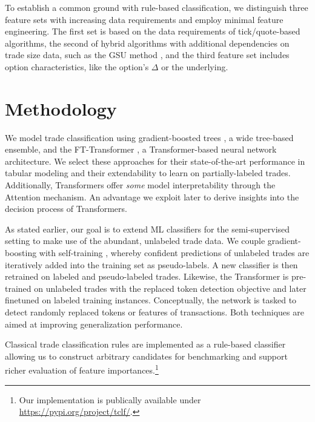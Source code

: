 To establish a common ground with rule-based classification, we distinguish three feature sets with increasing data requirements and employ minimal feature engineering. The first set is based on the data requirements of tick/quote-based algorithms, the second of hybrid algorithms with additional dependencies on trade size data, such as the \gls{GSU} method \autocite{grauerOptionTradeClassification2022}, and the third feature set includes option characteristics, like the option's $\Delta$ or the underlying. 

\section{Methodology}

We model trade classification using gradient-boosted trees \autocites[][]{friedmanGreedyFunctionApproximation2001}, a wide tree-based ensemble, and the FT-Transformer \autocite{gorishniyRevisitingDeepLearning2021}, a Transformer-based neural network architecture. We select these approaches for their state-of-the-art performance in tabular modeling \autocites[][]{gorishniyRevisitingDeepLearning2021}[][]{grinsztajnWhyTreebasedModels2022} and their extendability to learn on partially-labeled trades. Additionally, Transformers offer \textit{some} model interpretability through the Attention mechanism. An advantage we exploit later to derive insights into the decision process of Transformers.

As stated earlier, our goal is to extend \gls{ML} classifiers for the semi-supervised setting to make use of the abundant, unlabeled trade data. We couple gradient-boosting with self-training \autocite{yarowskyUnsupervisedWordSense1995}, whereby confident predictions of unlabeled trades are iteratively added into the training set as pseudo-labels. A new classifier is then retrained on labeled and pseudo-labeled trades. Likewise, the Transformer is pre-trained on unlabeled trades with the replaced token detection objective \autocite{clarkElectraPretrainingText2020} and later finetuned on labeled training instances. Conceptually, the network is tasked to detect randomly replaced tokens or features of transactions. Both techniques are aimed at improving generalization performance.

Classical trade classification rules are implemented as a rule-based classifier allowing us to construct arbitrary candidates for benchmarking and support richer evaluation of feature importances.\footnote{Our implementation is publically available under \url{https://pypi.org/project/tclf/}.}

